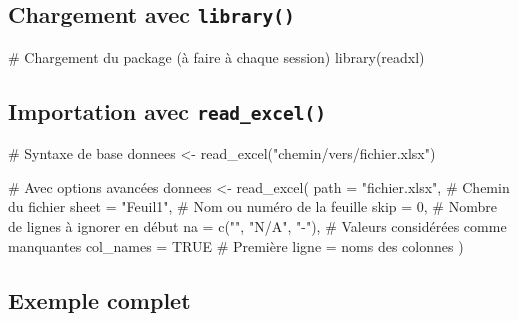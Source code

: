 \documentclass[
  french,
  11pt,
  a4paper,
]{article}
\newenvironment{Shaded}{}{}
\newcommand{\AttributeTok}[1]{\textcolor[rgb]{0.84,0.23,0.29}{#1}}
\newcommand{\CommentTok}[1]{\textcolor[rgb]{0.42,0.45,0.49}{#1}}
\newcommand{\ConstantTok}[1]{\textcolor[rgb]{0.00,0.36,0.77}{#1}}
\newcommand{\DecValTok}[1]{\textcolor[rgb]{0.00,0.36,0.77}{#1}}
\newcommand{\FunctionTok}[1]{\textcolor[rgb]{0.44,0.26,0.76}{#1}}
\newcommand{\NormalTok}[1]{\textcolor[rgb]{0.14,0.16,0.18}{#1}}
\newcommand{\OtherTok}[1]{\textcolor[rgb]{0.44,0.26,0.76}{#1}}
\newcommand{\StringTok}[1]{\textcolor[rgb]{0.01,0.18,0.38}{#1}}
\begin{document}
\subsection{\texorpdfstring{Chargement avec
\texttt{library()}}{Chargement avec library()}}\label{chargement-avec-library}

\begin{Shaded}
\begin{Highlighting}[]
\CommentTok{\# Chargement du package (à faire à chaque session)}
\FunctionTok{library}\NormalTok{(readxl)}
\end{Highlighting}
\end{Shaded}

\subsection{\texorpdfstring{Importation avec
\texttt{read\_excel()}}{Importation avec read\_excel()}}\label{importation-avec-read_excel}

\begin{Shaded}
\begin{Highlighting}[]
\CommentTok{\# Syntaxe de base}
\NormalTok{donnees }\OtherTok{\textless{}{-}} \FunctionTok{read\_excel}\NormalTok{(}\StringTok{"chemin/vers/fichier.xlsx"}\NormalTok{)}

\CommentTok{\# Avec options avancées}
\NormalTok{donnees }\OtherTok{\textless{}{-}} \FunctionTok{read\_excel}\NormalTok{(}
  \AttributeTok{path =} \StringTok{"fichier.xlsx"}\NormalTok{,      }\CommentTok{\# Chemin du fichier}
  \AttributeTok{sheet =} \StringTok{"Feuil1"}\NormalTok{,           }\CommentTok{\# Nom ou numéro de la feuille}
  \AttributeTok{skip =} \DecValTok{0}\NormalTok{,                   }\CommentTok{\# Nombre de lignes à ignorer en début}
  \AttributeTok{na =} \FunctionTok{c}\NormalTok{(}\StringTok{""}\NormalTok{, }\StringTok{"N/A"}\NormalTok{, }\StringTok{"{-}"}\NormalTok{),    }\CommentTok{\# Valeurs considérées comme manquantes}
  \AttributeTok{col\_names =} \ConstantTok{TRUE}            \CommentTok{\# Première ligne = noms des colonnes}
\NormalTok{)}
\end{Highlighting}
\end{Shaded}

\subsection{Exemple complet}\label{exemple-complet}
\end{document}
